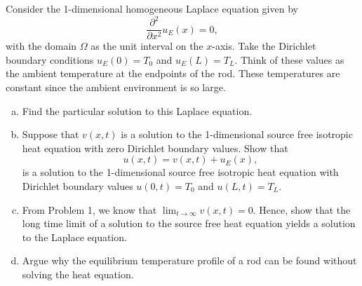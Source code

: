 \documentclass[12pt]{article} %
\begin{document}
\newpage
\begin{problem}
    Consider the 1-dimensional homogeneous Laplace equation given by 
    \[
    \frac{\partial^2}{\partial x^2} u_E(x) = 0,
    \]
    with the domain $\Omega$ as the unit interval on the $x$-axis.  Take the Dirichlet boundary conditions $u_E(0)=T_0$ and $u_E(L)=T_L$.  Think of these values as the ambient temperature at the endpoints of the rod.  These temperatures are constant since the ambient environment is so large.
    \begin{enumerate}[(a)]
        \item Find the particular solution to this Laplace equation.
        \item Suppose that $v(x,t)$ is a solution to the 1-dimensional source free isotropic heat equation with zero Dirichlet boundary values. Show that 
        \[
        u(x,t)=v(x,t)+u_E(x),
        \]  
        is a solution to the 1-dimensional source free isotropic heat equation with Dirichlet boundary values $u(0,t)=T_0$ and $u(L,t)=T_L$.
        \item From Problem 1, we know that $\lim_{t\to \infty} v(x,t) = 0$.  Hence, show that the long time limit of a solution to the source free heat equation yields a solution to the Laplace equation.
        \item Argue why the equilibrium temperature profile of a rod can be found without solving the heat equation.
    \end{enumerate}
\end{problem}
\end{document}
